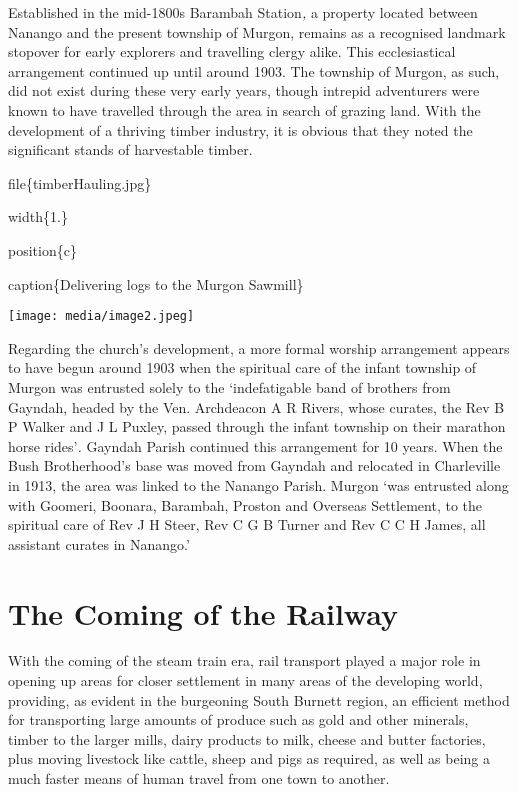 Established in the mid-1800s Barambah Station\emph{,} a property located between Nanango and the present township of Murgon, remains as a recognised landmark stopover for early explorers and travelling clergy alike. This ecclesiastical arrangement continued up until around 1903. The township of Murgon, as such, did not exist during these very early years, though intrepid adventurers were known to have travelled through the area in search of grazing land. With the development of a thriving timber industry, it is obvious that they noted the significant stands of harvestable timber.

file\{timberHauling.jpg\}

width\{1.\}

position\{c\}

caption\{Delivering logs to the Murgon Sawmill\}

\texttt{[image: media/image2.jpeg]}

Regarding the church's development, a more formal worship arrangement appears to have begun around 1903 when the spiritual care of the infant township of Murgon was entrusted solely to the `indefatigable band of brothers from Gayndah, headed by the Ven. Archdeacon A R Rivers, whose curates, the Rev B P Walker and J L Puxley, passed through the infant township on their marathon horse rides'\emph{.} Gayndah Parish continued this arrangement for 10 years. When the Bush Brotherhood's base was moved from Gayndah and relocated in Charleville in 1913, the area was linked to the Nanango Parish. Murgon `was entrusted along with Goomeri, Boonara, Barambah, Proston and Overseas Settlement, to the spiritual care of Rev J H Steer, Rev C G B Turner and Rev C C H James, all assistant curates in Nanango.'

\hypertarget{the-coming-of-the-railway}{%
\section{The Coming of the Railway}\label{the-coming-of-the-railway}}

With the coming of the steam train era, rail transport played a major role in opening up areas for closer settlement in many areas of the developing world, providing, as evident in the burgeoning South Burnett region, an efficient method for transporting large amounts of produce such as gold and other minerals, timber to the larger mills, dairy products to milk, cheese and butter factories, plus moving livestock like cattle, sheep and pigs as required, as well as being a much faster means of human travel from one town to another.

